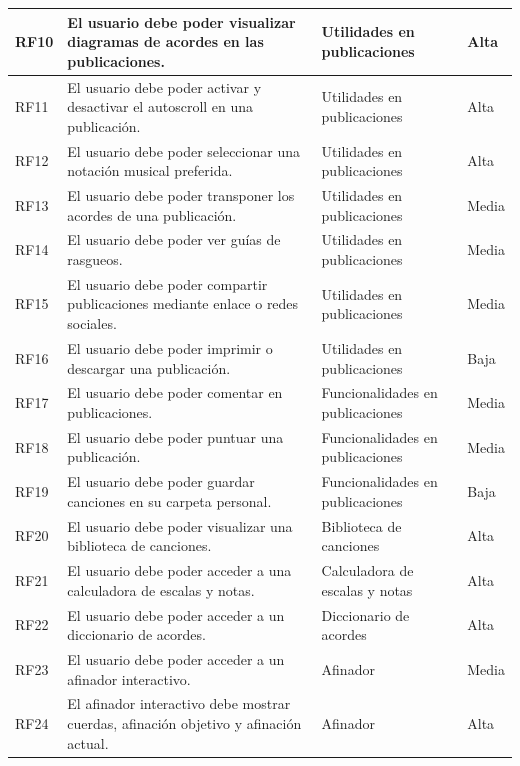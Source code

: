 \begin{table}[H]
\begin{tabular}{l p{} p{} l}
        RF10 & El usuario debe poder visualizar diagramas de acordes en las publicaciones. & Utilidades en publicaciones & Alta \\ \hline
        RF11 & El usuario debe poder activar y desactivar el autoscroll en una publicación. & Utilidades en publicaciones & Alta \\ \hline
        RF12 & El usuario debe poder seleccionar una notación musical preferida. & Utilidades en publicaciones & Alta \\ \hline
        RF13 & El usuario debe poder transponer los acordes de una publicación. & Utilidades en publicaciones & Media \\ \hline
        RF14 & El usuario debe poder ver guías de rasgueos. & Utilidades en publicaciones & Media \\ \hline
        RF15 & El usuario debe poder compartir publicaciones mediante enlace o redes sociales. & Utilidades en publicaciones & Media \\ \hline
        RF16 & El usuario debe poder imprimir o descargar una publicación. & Utilidades en publicaciones & Baja \\ \hline
        RF17 & El usuario debe poder comentar en publicaciones. & Funcionalidades en publicaciones & Media \\ \hline
        RF18 & El usuario debe poder puntuar una publicación. & Funcionalidades en publicaciones & Media \\ \hline
        RF19 & El usuario debe poder guardar canciones en su carpeta personal. & Funcionalidades en publicaciones & Baja \\ \hline

        RF20 & El usuario debe poder visualizar una biblioteca de canciones. & Biblioteca de canciones & Alta \\ \hline

        RF21 & El usuario debe poder acceder a una calculadora de escalas y notas. & Calculadora de escalas y notas & Alta \\ \hline

        RF22 & El usuario debe poder acceder a un diccionario de acordes. & Diccionario de acordes & Alta \\ \hline

        RF23 & El usuario debe poder acceder a un afinador interactivo. & Afinador & Media \\ \hline
        RF24 & El afinador interactivo debe mostrar cuerdas, afinación objetivo y afinación actual. & Afinador & Alta \\ \hline


\end{tabular}
\end{table}
